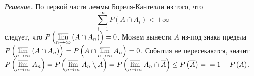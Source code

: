 \textit{Решение.} По первой части леммы Бореля-Кантелли из того, что
$$ \sum \limits_{i=1}^{ \infty } P \left( A \cap A_i \right) < + \infty $$
следует, что $P \left( \varlimsup \limits_{n \to \infty } \left( A \cap A_n \right) \right) = 0$.
Можем вынести $A$ из-под знака предела
$P \left( \varlimsup \limits_{n \to \infty } \left( A \cap A_n \right) \right) =
P \left( A \cap \varlimsup \limits_{n \to \infty } A_n \right) =
0$.
События не пересекаются,
значит
$P \left( \varlimsup \limits_{n \to \infty } A_n \right) =
P \left( \varlimsup \limits_{n \to \infty } A_n \setminus A \right) =
P \left( \varlimsup \limits_{n \to \infty } A_n \cap \overline{A} \right) \leq
P \left( \overline{A} \right) = \\
= 1 - P \left( A \right) $.
